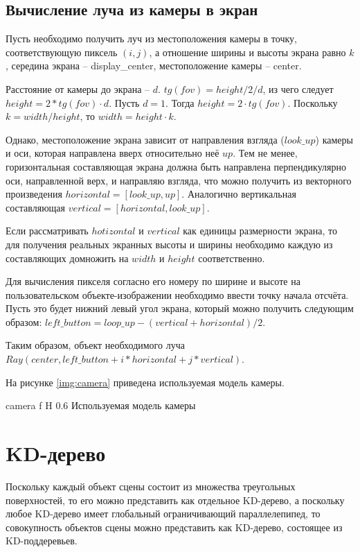 \subsection{Вычисление луча из камеры в экран}

Пусть необходимо получить луч из местоположения камеры в точку, соответствующую пиксель $(i, j)$, а отношение ширины и высоты экрана равно $k$, середина экрана -- display\_center, местоположение камеры -- center.

 Расстояние от камеры до экрана -- $d$. $tg(fov) = height / 2 / d $, из чего следует $height = 2 * tg(fov) \cdot d$. 
 Пусть $d = 1$. 
 Тогда $height = 2 \cdot tg(fov)$. 
 Поскольку $k = width / height$, то $width = height \cdot k $. 
 
 Однако, местоположение экрана зависит от направления взгляда ($look\_up$) камеры и оси, которая направлена вверх относительно неё $up$. 
 Тем не менее, горизонтальная составляющая экрана должна быть направлена перпендикулярно оси, направленной верх, и направляю взгляда, что можно получить из векторного произведения $horizontal = [look\_up, up]$. 
 Аналогично вертикальная составляющая $vertical = [horizontal, look\_up]$. 
 
 Если рассматривать $hotizontal$ и $vertical$ как единицы размерности экрана, то для получения реальных экранных высоты и ширины необходимо каждую из составляющих домножить на $width$ и $height$ соответственно. 
 
 Для вычисления пикселя согласно его номеру по ширине и высоте на пользовательском объекте-изображении необходимо ввести точку начала отсчёта. Пусть это будет нижний левый угол экрана, который можно получить следующим образом: $left\_button = loop\_up - (vertical + horizontal) / 2$.
 
 Таким образом, объект необходимого луча $Ray(center,  left\_button + i * horizontal + j * vertical)$.
 
 На рисунке \ref{img:camera} приведена используемая модель камеры.
 
 {camera}
 {f}
 {H}
 {0.6\textwidth}
 {Используемая модель камеры}

\section{KD-дерево}

Поскольку каждый объект сцены состоит из множества треугольных поверхностей, то его можно представить как отдельное KD-дерево, а поскольку любое KD-дерево имеет глобальный ограничивающий параллелепипед, то совокупность объектов сцены можно представить как KD-дерево, состоящее из KD-поддеревьев.

